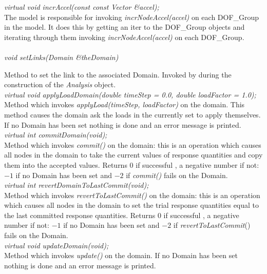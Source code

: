 {\em virtual void incrAccel(const const Vector \&accel);} \\
The model is responsible for invoking {\em incrNodeAccel(accel)} on each
DOF\_Group in the model. It does this by getting an iter to the
DOF\_Group objects and iterating through them invoking {\em
incrNodeAccel(accel)} on each DOF\_Group. \\



  \\
{\em void setLinks(Domain \&theDomain)} 

Method to set the link to the associated Domain. Invoked by
during the construction of the {\em Analysis} object.\\

{\em virtual void applyLoadDomain(double timeStep = 0.0, double
loadFactor = 1.0);}\\
Method which invokes {\em applyLoad(timeStep, loadFactor)} on the
domain. This method causes the domain ask the loads in the currently
set to apply themselves. If no Domain has been set nothing is done and an error
message is printed. \\ 


{\em virtual int commitDomain(void);} \\
Method which invokes {\em commit()} on the domain: this is an
operation which causes all nodes in the domain to take the current
values of response quantities and copy them into the accepted values. 
Returns $0$ if successful , a negative number if not: $-1$ if no
Domain has been set and $-2$ if {\em commit()} fails on the Domain.\\

{\em virtual int revertDomainToLastCommit(void);} \\
Method which invokes {\em revertToLastCommit()} on the domain: this is an
operation which causes all nodes in the domain to set the trial
response quantities equal to the last committed response quantities.
Returns $0$ if successful , a negative number if not: $-1$ if no
Domain has been set and $-2$ if {\em revertToLastCommit}() fails on
the Domain.\\ 

{\em virtual void updateDomain(void);}\\
Method which invokes {\em update()} on the domain. If no Domain has
been set nothing is done and an error message is printed. \\ 

